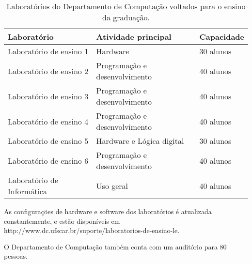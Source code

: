 \begin{table}[htb!]
\centering
\begin{tabular}{|l|l|l|} \hline
\textbf{Laboratório} & \textbf{Atividade principal}& \textbf{Capacidade} \\ \hline
Laboratório de ensino 1    & Hardware &  30 alunos\\ \hline
Laboratório de ensino 2    & Programação e desenvolvimento &  40 alunos\\ \hline
Laboratório de ensino 3    & Programação e desenvolvimento &  40 alunos\\ \hline
Laboratório de ensino 4    & Programação e desenvolvimento &  40 alunos\\ \hline
Laboratório de ensino 5    & Hardware e Lógica digital &  30 alunos\\ \hline
Laboratório de ensino 6    & Programação e desenvolvimento &  40 alunos\\ \hline
Laboratório de Informática & Uso geral &  40 alunos \\ \hline
\end{tabular}
\caption{Laboratórios do Departamento de Computação voltados para o ensino da graduação.}
\label{table:Labs}
\end{table}
 
 As configurações de hardware e software dos laboratórios é atualizada constantemente, e estão disponíveis em http://www.dc.ufscar.br/suporte/laboratorios-de-ensino-le.
 
 O Departamento de Computação também conta com um auditório para 80 pessoas.


